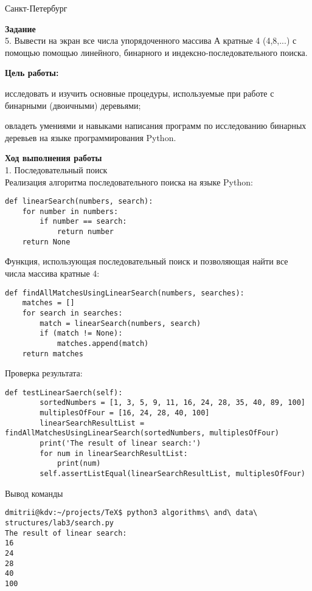 \documentclass[12pt]{article}
\begin{document}
\par\bigskip\par\bigskip\par\bigskip\par\bigskip\par\bigskip\par\bigskip\par\bigskip\par\bigskip
\begin{center}
Санкт-Петербург
\par{}
\end{center}
\pagebreak
\textbf{Задание} \\

5. Вывести на экран все числа упорядоченного массива А кратные 4 (4,8,...) с помощью
помощью линейного, бинарного и индексно-последовательного поиска. \\
\par
\textbf{ Цель работы:}
\begin{list}{-}{}
\item исследовать и изучить основные процедуры, используемые при работе с бинарными
(двоичными) деревьями;
\item овладеть умениями и навыками написания программ по исследованию бинарных деревьев
на языке программирования Python.
\end{list}


\par
\textbf{Ход выполнения работы}\\
1. Последовательный поиск\\
Реализация алгоритма последовательного поиска на языке Python:
\begin{verbatim}
def linearSearch(numbers, search):
	for number in numbers:
		if number == search:
			return number
	return None
\end{verbatim}

Функция, использующая последовательный поиск и позволяющая найти все числа массива кратные 4:
\begin{verbatim}
def findAllMatchesUsingLinearSearch(numbers, searches):
	matches = []
	for search in searches:
		match = linearSearch(numbers, search)
		if (match != None):
			matches.append(match)
	return matches
\end{verbatim}

Проверка результата:
\begin{verbatim}
def testLinearSaerch(self):
		sortedNumbers = [1, 3, 5, 9, 11, 16, 24, 28, 35, 40, 89, 100]
		multiplesOfFour = [16, 24, 28, 40, 100]
		linearSearchResultList = findAllMatchesUsingLinearSearch(sortedNumbers, multiplesOfFour)
		print('The result of linear search:')
		for num in linearSearchResultList:
			print(num)
		self.assertListEqual(linearSearchResultList, multiplesOfFour)
\end{verbatim}
Вывод команды
\begin{verbatim}
dmitrii@kdv:~/projects/TeX$ python3 algorithms\ and\ data\ structures/lab3/search.py 
The result of linear search:
16
24
28
40
100
\end{verbatim}
\end{document}
